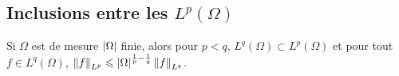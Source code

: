 

    




  
    
  
  
    
  


\subsection{Inclusions entre les $L^p(\Omega)$}

\begin{theo}{}
    Si $\Omega$ est de mesure $\left| \Omega \right|$ finie, alors pour $p<q$, $L^q(\Omega) \subset L^p(\Omega)$ et pour tout $f \in L^q(\Omega)$, $\norm{f}_{L^p} \leqslant \left| \Omega \right|^{\frac{1}{p} - \frac{1}{q}} \norm{f}_{L^q}$.
\end{theo}

